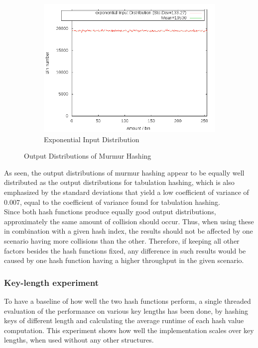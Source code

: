 \documentclass[11pt]{article} %
\begin{document}
\begin{figure}[H]\ContinuedFloat
    \centering
    \begin{subfigure}[b]{0.45\textwidth}
        \includegraphics[width=\textwidth]{Graphs/Dist/Murmur_exponential_dist.png}
        \caption{Exponential Input Distribution}
        \label{fig:murmur_dist_exp}
    \end{subfigure}
    \caption{Output Distributions of Murmur Hashing}\label{fig:murmur_dist}
\end{figure}
As seen, the output distributions of murmur hashing appear to be equally well distributed as the output distributions for tabulation hashing, which is also emphasized by the standard deviations that yield a low coefficient of variance of 0.007, equal to the coefficient of variance found for tabulation hashing.\\

Since both hash functions produce equally good output distributions, approximately the same amount of collision should occur. Thus, when using these in combination with a given hash index, the results should not be affected by one scenario having more collisions than the other. Therefore, if keeping all other factors besides the hash functions fixed, any difference in such results would be caused by one hash function having a higher throughput in the given scenario.

\subsubsection{Key-length experiment}
\label{subsubsec:hash_func_key_len}
To have a baseline of how well the two hash functions perform, a single threaded evaluation of the performance on various key lengths has been done, by hashing keys of different length and calculating the average runtime of each hash value computation. This experiment shows how well the implementation scales over key lengths, when used without any other structures. \\
\end{document}
